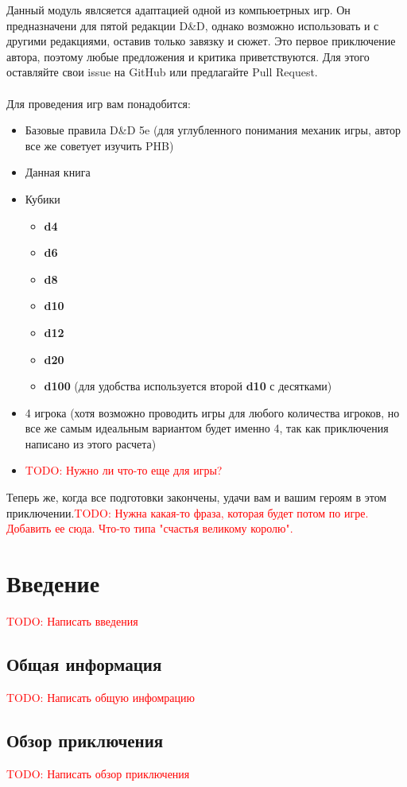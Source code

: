 \documentclass[10pt,a4paper]{book}
\newcommand{\TODO}[1]{\textcolor{red}{TODO: #1}}
\renewcommand{\d}[1]{\textbf {d{#1}}}
\begin{document}
			Данный модуль явлсяется адаптацией одной из компьюетрных игр. Он предназначени для пятой редакции D\&D, однако возможно использовать и с другими редакциями, оставив только завязку и сюжет. Это первое приключение автора, поэтому любые предложения и критика приветствуются. Для этого оставляйте свои issue на GitHub или предлагайте Pull Request.
			\\\\
			Для проведения игр вам понадобится:
			\begin{itemize}
				\item Базовые правила D\&D 5e (для углубленного понимания механик игры, автор все же советует изучить PHB)
				\item Данная книга
				\item Кубики
					\begin{itemize}
						\item \d{4}
						\item \d{6}
						\item \d{8}
						\item \d{10}
						\item \d{12}
						\item \d{20}
						\item \d{100} (для удобства используется второй \d{10} с десятками)
					\end{itemize}
				\item 4 игрока (хотя возможно проводить игры для любого количества игроков, но все же самым идеальным вариантом будет именно 4, так как приключения написано из этого расчета)
				\item \TODO{Нужно ли что-то еще для игры?}
			\end{itemize}
			Теперь же, когда все подготовки закончены, удачи вам и вашим героям в этом приключении.\TODO{Нужна какая-то фраза, которая будет потом по игре. Добавить ее сюда. Что-то типа "счастья великому королю".}	
		
	\chapter{Введение}
		\TODO{Написать введения}
		\section{Общая информация}
			\TODO{Написать общую инфомрацию}
		\section{Обзор приключения}
			\TODO{Написать обзор приключения}
	
\end{document}
